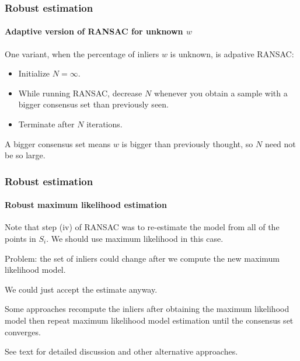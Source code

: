 \documentclass[aspectratio=169]{beamer}
\begin{document}
\begin{frame}
\frametitle{Robust estimation}
\framesubtitle{Adaptive version of RANSAC for unknown $w$}

One variant, when the percentage of inliers $w$ is unknown, is
\alert{adpative RANSAC}:
\begin{itemize}
\item Initialize $N=\infty$.
\item While running RANSAC, decrease $N$ whenever you obtain a sample
  with a bigger consensus set than previously seen.
\item Terminate after $N$ iterations.
\end{itemize}

\medskip

A bigger consensus set means $w$ is bigger
than previously thought, so $N$ need not be so large.

\end{frame}

\begin{frame}
\frametitle{Robust estimation}
\framesubtitle{Robust maximum likelihood estimation}

Note that step (iv) of RANSAC was to re-estimate the model from
\alert{all of the points} in $S_i$.  We should use maximum likelihood
in this case.

\medskip

\alert{Problem}: the set of inliers could \alert{change} after we
compute the new maximum likelihood model.

\medskip

We could just \alert{accept the estimate anyway}.

\medskip

Some approaches \alert{recompute the inliers} after obtaining the
maximum likelihood model then \alert{repeat} maximum likelihood model
estimation until the consensus set converges.

\medskip

See text for detailed discussion and other alternative approaches.

\end{frame}
\end{document}
